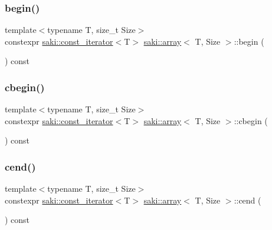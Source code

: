 \mbox{\label{classsaki_1_1array_adeafefc4c1a1cf24a931850366cb85ae}} 
\subsubsection{\texorpdfstring{begin()}{begin()}\hspace{0.1cm}{\footnotesize\ttfamily [2/2]}}
{\footnotesize\ttfamily template$<$typename T, size\+\_\+t Size$>$ \\
constexpr \mbox{\hyperlink{classsaki_1_1const__iterator}{saki\+::const\+\_\+iterator}}$<$T$>$ \mbox{\hyperlink{classsaki_1_1array}{saki\+::array}}$<$ T, Size $>$\+::begin (\begin{DoxyParamCaption}{ }\end{DoxyParamCaption}) const\hspace{0.3cm}{\ttfamily [inline]}}

\mbox{\label{classsaki_1_1array_a0423222730174b0538e70c9c7d552e26}} 
\subsubsection{\texorpdfstring{cbegin()}{cbegin()}}
{\footnotesize\ttfamily template$<$typename T, size\+\_\+t Size$>$ \\
constexpr \mbox{\hyperlink{classsaki_1_1const__iterator}{saki\+::const\+\_\+iterator}}$<$T$>$ \mbox{\hyperlink{classsaki_1_1array}{saki\+::array}}$<$ T, Size $>$\+::cbegin (\begin{DoxyParamCaption}{ }\end{DoxyParamCaption}) const\hspace{0.3cm}{\ttfamily [inline]}}

\mbox{\label{classsaki_1_1array_a80d8f941a4045ac5b2af32c73548cb57}} 
\subsubsection{\texorpdfstring{cend()}{cend()}}
{\footnotesize\ttfamily template$<$typename T, size\+\_\+t Size$>$ \\
constexpr \mbox{\hyperlink{classsaki_1_1const__iterator}{saki\+::const\+\_\+iterator}}$<$T$>$ \mbox{\hyperlink{classsaki_1_1array}{saki\+::array}}$<$ T, Size $>$\+::cend (\begin{DoxyParamCaption}{ }\end{DoxyParamCaption}) const\hspace{0.3cm}{\ttfamily [inline]}}

